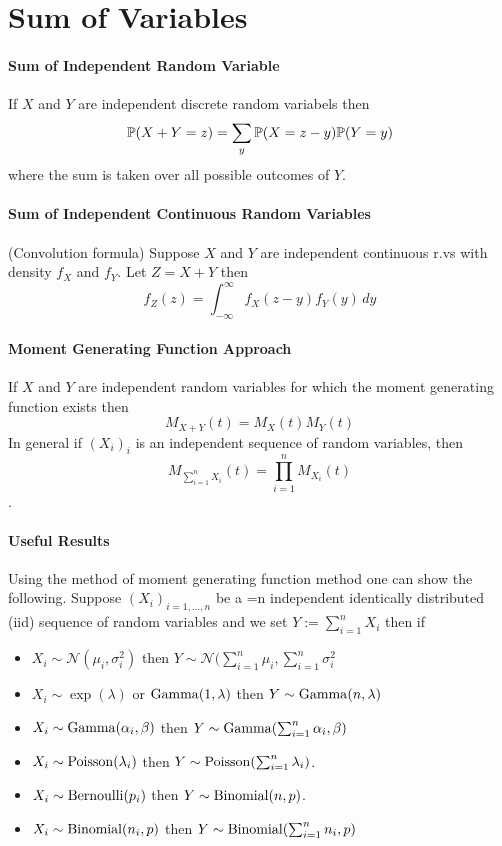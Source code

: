 \section{Sum of Variables}
\paragraph{Sum of Independent Random Variable}
If \(X\) and \(Y\) are independent discrete random variabels then
\[\mathbb{P}(X + Y = z) = \sum_y \mathbb{P}(X = z - y)\mathbb{P}(Y = y)\]
where the sum is taken over all possible outcomes of \(Y\).

\paragraph{Sum of Independent Continuous Random Variables}
(Convolution formula) Suppose \(X\) and \(Y\) are independent continuous r.vs with density \(f_X\) and \(f_Y\). Let \(Z = X + Y\) then
\[f_Z(z) = \int_{-\infty}^\infty f_X(z-y)f_Y(y) \, dy\]

\paragraph{Moment Generating Function Approach}
If \(X\) and \(Y\) are independent random variables for which the moment generating function exists then
\[M_{X+Y}(t) = M_X(t)M_Y(t)\]
In general if \((X_i)_i\) is an independent sequence of random variables, then 
\[M_{\sum_{i=1}^n X_i}(t) = \prod_{i=1}^n M_{X_i}(t)\].

\paragraph{Useful Results}
Using the method of moment generating function method one can show the following. Suppose \((X_i)_{i=1,\dots,n}\) be a =n independent identically distributed (iid) sequence of random variables and we set \(Y := \sum_{i=1}^n X_i\) then if
\begin{itemize}
    \item \(X_i \sim \mathcal{N}(\mu_i, \sigma_i^2)\) then \(Y \sim \mathcal{N}(\sum_{i=1}^n \mu_i, \sum_{i=1}^n \sigma_i^2\)
    \item \(X_i \sim \exp(\lambda)\) or \(\mathrm{Gamma}(1, \lambda)\) then \(Y \sim \mathrm{Gamma}(n, \lambda)\)
    \item \(X_i \sim \mathrm{Gamma}(\alpha_i, \beta)\) then \(Y \sim \mathrm{Gamma}(\sum_{i=1}^n \alpha_i, \beta)\)
    \item \(X_i \sim \mathrm{Poisson}(\lambda_i)\) then \(Y \sim \mathrm{Poisson}(\sum_{i=1}^n \lambda_i)\).
    \item \(X_i \sim \mathrm{Bernoulli}(p_i)\) then \(Y \sim \mathrm{Binomial}(n,p)\).
    \item \(X_i \sim \mathrm{Binomial}(n_i, p)\) then \(Y \sim \mathrm{Binomial}(\sum_{i=1}^n n_i, p)\)
\end{itemize}